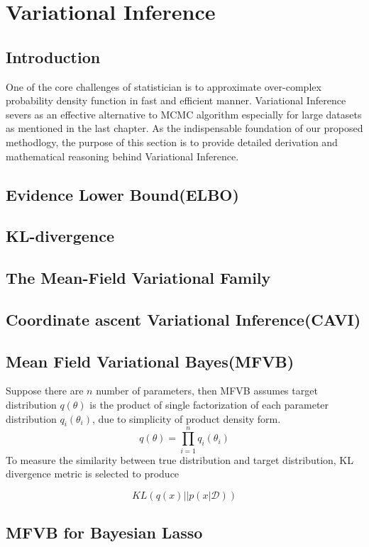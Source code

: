 \section{Variational Inference}
\label{VI}
\subsection{Introduction}
One of the core challenges of statistician is to approximate over-complex probability density function in fast and efficient manner. Variational Inference severs as an effective alternative to MCMC algorithm especially for large datasets as mentioned in the last chapter. As the indispensable foundation of our proposed methodlogy, the purpose of this section is to provide detailed derivation and mathematical reasoning behind Variational Inference.
\subsection{Evidence Lower Bound(ELBO)}


\subsection{KL-divergence}


\subsection{The Mean-Field Variational Family}

\subsection{Coordinate ascent Variational Inference(CAVI)}




\subsection{Mean Field Variational Bayes(MFVB)}

Suppose there are $n$ number of parameters, then MFVB assumes target distribution $q(\theta)$ is the product of single factorization of each parameter distribution $q_i(\theta_i)$, due to simplicity of product density form. 
\begin{equation}
	q(\theta) = \prod_{i=1}^{n} q_i(\theta_i)
\end{equation}
To measure the similarity between true distribution and target distribution, KL divergence metric is selected to produce

\begin{equation}
	KL(q(x)||p(x|\mathcal{D})) 
\end{equation}

\subsection{MFVB for Bayesian Lasso}







